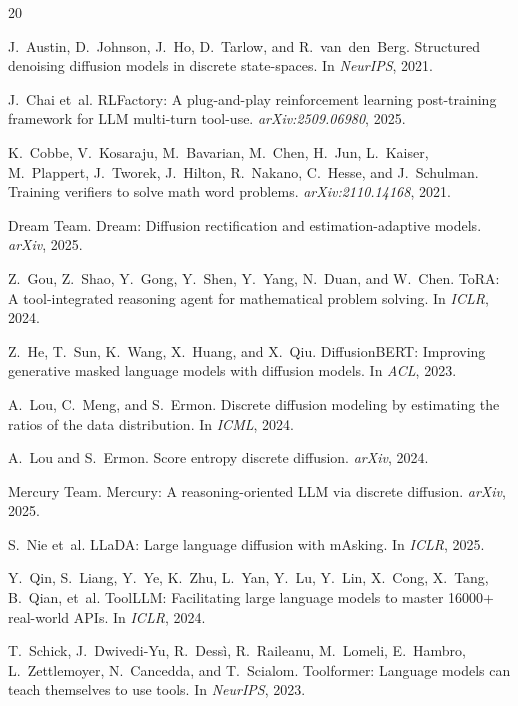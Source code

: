 \documentclass{article}
\begin{document}
\begin{thebibliography}{20}

J.~Austin, D.~Johnson, J.~Ho, D.~Tarlow, and R.~van~den~Berg.
\newblock Structured denoising diffusion models in discrete state-spaces.
\newblock In \emph{NeurIPS}, 2021.

J.~Chai et~al.
\newblock RLFactory: A plug-and-play reinforcement learning post-training framework for LLM multi-turn tool-use.
\newblock \emph{arXiv:2509.06980}, 2025.

K.~Cobbe, V.~Kosaraju, M.~Bavarian, M.~Chen, H.~Jun, L.~Kaiser, M.~Plappert, J.~Tworek, J.~Hilton, R.~Nakano, C.~Hesse, and J.~Schulman.
\newblock Training verifiers to solve math word problems.
\newblock \emph{arXiv:2110.14168}, 2021.

Dream Team.
\newblock Dream: Diffusion rectification and estimation-adaptive models.
\newblock \emph{arXiv}, 2025.

Z.~Gou, Z.~Shao, Y.~Gong, Y.~Shen, Y.~Yang, N.~Duan, and W.~Chen.
\newblock ToRA: A tool-integrated reasoning agent for mathematical problem solving.
\newblock In \emph{ICLR}, 2024.

Z.~He, T.~Sun, K.~Wang, X.~Huang, and X.~Qiu.
\newblock DiffusionBERT: Improving generative masked language models with diffusion models.
\newblock In \emph{ACL}, 2023.

A.~Lou, C.~Meng, and S.~Ermon.
\newblock Discrete diffusion modeling by estimating the ratios of the data distribution.
\newblock In \emph{ICML}, 2024.

A.~Lou and S.~Ermon.
\newblock Score entropy discrete diffusion.
\newblock \emph{arXiv}, 2024.

Mercury Team.
\newblock Mercury: A reasoning-oriented LLM via discrete diffusion.
\newblock \emph{arXiv}, 2025.

S.~Nie et~al.
\newblock LLaDA: Large language diffusion with mAsking.
\newblock In \emph{ICLR}, 2025.

Y.~Qin, S.~Liang, Y.~Ye, K.~Zhu, L.~Yan, Y.~Lu, Y.~Lin, X.~Cong, X.~Tang, B.~Qian, et~al.
\newblock ToolLLM: Facilitating large language models to master 16000+ real-world APIs.
\newblock In \emph{ICLR}, 2024.

T.~Schick, J.~Dwivedi-Yu, R.~Dess{\`i}, R.~Raileanu, M.~Lomeli, E.~Hambro, L.~Zettlemoyer, N.~Cancedda, and T.~Scialom.
\newblock Toolformer: Language models can teach themselves to use tools.
\newblock In \emph{NeurIPS}, 2023.


\end{thebibliography}
\end{document}
